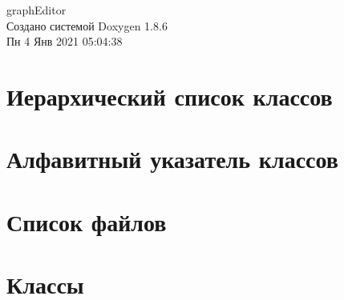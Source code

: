 \documentclass[twoside]{book}
\newcommand{\clearemptydoublepage}{%
  \newpage{\pagestyle{empty}\cleardoublepage}%
}
\begin{document}
\hypersetup{pageanchor=false}
\begin{titlepage}
\vspace*{7cm}
\begin{center}%
{\Large graph\-Editor }\\
\vspace*{1cm}
{\large Создано системой Doxygen 1.8.6}\\
\vspace*{0.5cm}
{\small Пн 4 Янв 2021 05:04:38}\\
\end{center}
\end{titlepage}
\clearemptydoublepage
\tableofcontents
\clearemptydoublepage
{}
\hypersetup{pageanchor=true}

\chapter{Иерархический список классов}

\chapter{Алфавитный указатель классов}

\chapter{Список файлов}

\chapter{Классы}



































\end{document}

